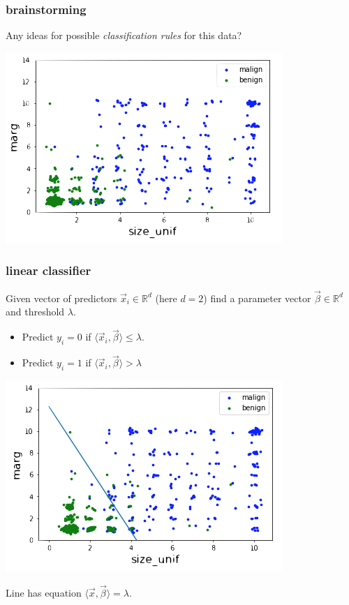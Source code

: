 \documentclass[handout,compress]{beamer}
\newcommand{\R}{\mathbb{R}}
\begin{document}
\begin{frame}
	\frametitle{brainstorming}
	\begin{center}
		Any ideas for possible \emph{classification rules} for this data?
		
		\includegraphics[width=.7\textwidth]{jittered.png}
		
	\end{center}
\end{frame}

\begin{frame}
	\frametitle{linear classifier}
	\begin{center}
		Given vector of predictors $\vec{x}_i \in \R^d$ (here $d = 2$) find a parameter vector $\vec{\beta} \in \R^d$ and threshold $\lambda$.
		\begin{itemize}
			\item Predict $y_i = 0$ if $\langle \vec{x}_i,\vec{\beta}\rangle \leq \lambda$.
			\item Predict $y_i = 1$ if $\langle \vec{x}_i,\vec{\beta}\rangle > \lambda$
		\end{itemize} 
		\includegraphics[width=.6\textwidth]{linear_classifier.png}
		
		\vspace{-.5em}
		Line has equation $\langle \vec{x},\vec{\beta}\rangle  = \lambda$. 
	\end{center}
\end{frame}
\end{document}
